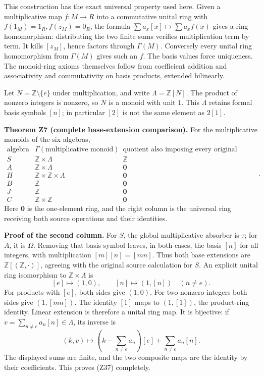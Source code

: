 \documentclass[
]{article}
\begin{document}
This construction has the exact universal property used here. Given a
multiplicative map \(f:M\to R\) into a commutative unital ring with
\(f(1_M)=1_R,f(z_M)=0_R\), the formula
\(\sum a_x[x]\mapsto\sum a_x f(x)\) gives a ring homomorphism:
distributing the two finite sums verifies multiplication term by term.
It kills \([z_M]\), hence factors through \(\Gamma(M)\). Conversely
every unital ring homomorphism from \(\Gamma(M)\) gives such an \(f\).
The basis values force uniqueness. The monoid-ring axioms themselves
follow from coefficient addition and associativity and commutativity on
basis products, extended bilinearly.

Let \(N=\mathbb Z\setminus\{e\}\) under multiplication, and write
\(\Lambda=\mathbb Z[N]\). The product of nonzero integers is nonzero, so
\(N\) is a monoid with unit \(1\). This \(\Lambda\) retains formal basis
symbols \([n]\); in particular \([2]\) is not the same element as
\(2[1]\).

\textbf{Theorem Z7 (complete base-extension comparison).} For the
multiplicative monoids of the six algebras, \[
\begin{array}{c|c|c}
\text{algebra}&\Gamma(\text{multiplicative monoid})
&\text{quotient also imposing every original addition}\\\hline
S&\mathbb Z\times\Lambda&\mathbb Z\\
A&\mathbb Z\times\Lambda&\mathbf0\\
H&\mathbb Z\times\mathbb Z\times\Lambda&\mathbf0\\
B&\mathbb Z&\mathbf0\\
J&\mathbb Z&\mathbf0\\
C&\mathbb Z\times\mathbb Z&\mathbf0
\end{array}.
\tag{Z36}
\] Here \(\mathbf0\) is the one-element ring, and the right column is
the universal ring receiving both source operations and their
identities.

\textbf{Proof of the second column.} For \(S\), the global
multiplicative absorber is \(\tau\); for \(A\), it is \(\Omega\).
Removing that basis symbol leaves, in both cases, the basis \([n]\) for
all integers, with multiplication \([m][n]=[mn]\). Thus both base
extensions are \(\mathbb Z[(\mathbb Z,\cdot)]\), agreeing with the
original source calculation for \(S\). An explicit unital ring
isomorphism to \(\mathbb Z\times\Lambda\) is \[
[e]\mapsto(1,0),\qquad [n]\mapsto(1,[n])\quad(n\ne e).
\tag{Z37}
\] For products with \([e]\), both sides give \((1,0)\). For two nonzero
integers both sides give \((1,[mn])\). The identity \([1]\) maps to
\((1,[1])\), the product-ring identity. Linear extension is therefore a
unital ring map. It is bijective: if
\(v=\sum_{n\ne e}a_n[n]\in\Lambda\), its inverse is \[
(k,v)\mapsto
\left(k-\sum_{n\ne e}a_n\right)[e]
+\sum_{n\ne e}a_n[n].
\tag{Z38}
\] The displayed sums are finite, and the two composite maps are the
identity by their coefficients. This proves (Z37) completely.
\end{document}
